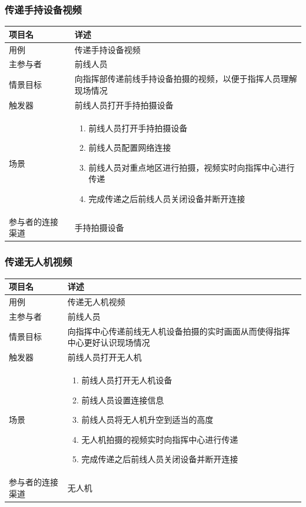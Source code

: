 \documentclass{ctexrep}
\begin{document}
\subsubsection{传递手持设备视频}
\begin{longtable}{p{2cm} | p{10cm}}
\hline
项目名 & 详述 \\
\hline
\hline
用例 & 传递手持设备视频 \\
\hline
主参与者 & 前线人员  \\
\hline
情景目标 & 向指挥部传递前线手持设备拍摄的视频，以便于指挥人员理解现场情况 \\
\hline
触发器 & 前线人员打开手持拍摄设备 \\
\hline
场景 & \begin{enumerate}
	\item 前线人员打开手持拍摄设备
	\item 前线人员配置网络连接
	\item 前线人员对重点地区进行拍摄，视频实时向指挥中心进行传递
	\item 完成传递之后前线人员关闭设备并断开连接
\end{enumerate} \\
\hline
参与者的连接渠道 & 手持拍摄设备 \\
\hline
\end{longtable}

\subsubsection{传递无人机视频}
\begin{longtable}{p{2cm} | p{10cm}}
\hline
项目名 & 详述 \\
\hline
\hline
用例 & 传递无人机视频 \\
\hline
主参与者 & 前线人员  \\
\hline
情景目标 & 向指挥中心传递前线无人机设备拍摄的实时画面从而使得指挥中心更好认识现场情况  \\
\hline
触发器 & 前线人员打开无人机 \\
\hline
场景 & \begin{enumerate}
	\item 前线人员打开无人机设备
	\item 前线人员设置连接信息
	\item 前线人员将无人机升空到适当的高度
	\item 无人机拍摄的视频实时向指挥中心进行传递
	\item 完成传递之后前线人员关闭设备并断开连接
\end{enumerate} \\
\hline
参与者的连接渠道 &  无人机\\
\hline
\end{longtable}
\end{document}
